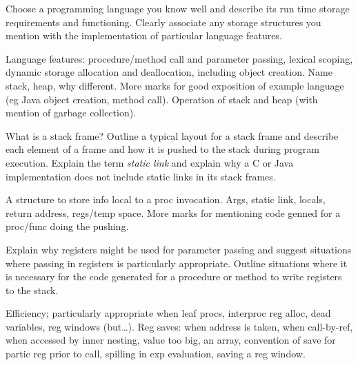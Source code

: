 \documentclass[11pt]{cityexam}
\begin{document}
\begin{questions}
\begin{subquestions}

\subquestion
Choose a programming language you know well and describe
its run time storage requirements and functioning.
Clearly associate any storage structures you
mention with the implementation of particular 
language features.

\begin{modelanswer}
Language features: procedure/method call and parameter passing,
lexical scoping, dynamic storage allocation and deallocation,
including object creation. Name stack, heap, why different.
More marks for good exposition of example language
(eg Java object creation, method call). Operation of
stack and heap (with mention of garbage collection).
\end{modelanswer}


\subquestion
What is a stack frame?
Outline a typical layout for a stack frame and describe 
each element of a frame and how it is pushed to the stack during
program execution. 
Explain the term {\em static link\/} and explain why a C or Java
implementation does not include static links in its stack frames.

\begin{modelanswer}
A structure to store info local to a proc invocation.
Args, static link, locals, return address, regs/temp space.
More marks for mentioning code genned for a proc/func doing the
pushing.
\end{modelanswer}

\subquestion
Explain why registers might be used for parameter passing and
suggest situations where passing in registers is particularly
appropriate. 
Outline situations where it is necessary for the code generated for a 
procedure or method to write registers to the stack.

\begin{modelanswer}
Efficiency; particularly appropriate when leaf procs, interproc
reg alloc, dead variables, reg windows (but\ldots).
Reg saves: when address is taken,
when call-by-ref,
when accessed by inner nesting,
value too big,
an array,
convention of save for partic reg prior to call,
spilling in exp evaluation,
saving a reg window.
\end{modelanswer}

\end{subquestions}


\end{questions}
\end{document}
